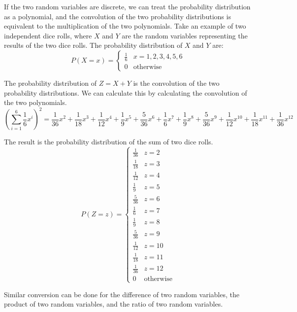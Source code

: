\documentclass[a4paper,12pt]{article}
\begin{document}
If the two random variables are discrete, we can treat the probability distribution as a polynomial, and the convolution of the two probability distributions is equivalent to the multiplication of the two polynomials.
Take an example of two independent dice rolls, where $X$ and $Y$ are the random variables representing the results of the two dice rolls.
The probability distribution of $X$ and $Y$ are:
\begin{equation*}
	P(X = x) = 
	\begin{cases}
		\frac16 & x = 1, 2, 3, 4, 5, 6 \\
		0 & \text{otherwise}
	\end{cases}
\end{equation*}

The probability distribution of $Z = X + Y$ is the convolution of the two probability distributions.
We can calculate this by calculating the convolution of the two polynomials.
\begin{equation*}
	\left(\sum_{i = 1}^{6} \frac{1}{6} x^i\right)^2 = \frac{1}{36}x^2 + \frac{1}{18}x^3 + \frac{1}{12}x^4 + \frac{1}{9}x^5 + \frac{5}{36}x^6 + \frac{1}{6}x^7 + \frac{1}{9}x^8 + \frac{5}{36}x^9 + \frac{1}{12}x^{10} + \frac{1}{18}x^{11} + \frac{1}{36}x^{12}
\end{equation*}

The result is the probability distribution of the sum of two dice rolls.
\begin{equation*}
	P(Z = z) = 
	\begin{cases}
		\frac{1}{36} & z = 2 \\
		\frac{1}{18} & z = 3 \\
		\frac{1}{12} & z = 4 \\
		\frac{1}{9} & z = 5 \\
		\frac{5}{36} & z = 6 \\
		\frac{1}{6} & z = 7 \\
		\frac{1}{9} & z = 8 \\
		\frac{5}{36} & z = 9 \\
		\frac{1}{12} & z = 10 \\
		\frac{1}{18} & z = 11 \\
		\frac{1}{36} & z = 12 \\
		0 & \text{otherwise}
	\end{cases}
\end{equation*}

Similar conversion can be done for the difference of two random variables, the product of two random variables, and the ratio of two random variables.
\end{document}
